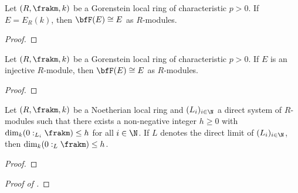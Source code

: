 \begin{lemma}
	Let $(R,\frakm,k)$ be a Gorenstein local ring of characteristic $p > 0$. If $E = E_R(k)$, then $\bfF(E)\cong E$ as $R$-modules.
\end{lemma}
\begin{proof}
	
\end{proof}

\begin{theorem}
	Let $(R,\frakm,k)$ be a Gorenstein local ring of characteristic $p > 0$. If $E$ is an injective $R$-module, then $\bfF(E)\cong E$ as $R$-modules.
\end{theorem}
\begin{proof}
\end{proof}

\begin{lemma}
	Let $(R,\frakm,k)$ be a Noetherian local ring and $(L_i)_{i\in\N}$ a direct system of $R$-modules such that there exists a non-negative integer $h\ge 0$ with $\dim_k(0 :_{L_i}\frakm)\le h$ for all $i\in\N$. If $L$ denotes the direct limit of $(L_i)_{i\in\N}$, then $\dim_k(0 :_L\frakm)\le h$.
\end{lemma}
\begin{proof}
\end{proof}

\begin{proof}[Proof of ]
\end{proof}